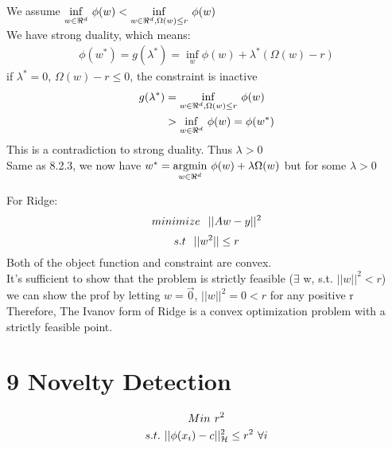 \documentclass{article}
\newenvironment{problem}[2][$\bullet$]{\begin{trivlist}\large
		\item[\hskip \labelsep {\bfseries #1}\hskip \labelsep {\bfseries #2.}]}  {\end{trivlist}}
\newenvironment{sub}[2][$-$]{\begin{trivlist}
		\item[\hskip \labelsep {\bfseries #1}\hskip \labelsep {\bfseries #2.}]}  {\end{trivlist}}
\begin{document}
\begin{sub}{8.2.4}
\end{sub}
We assume $\underset{w \in \Re^d}{\operatorname{inf}} \hspace{0.05in}\phi(w)  <\underset{w \in \Re^d ,\Omega(w) \leq r}{\operatorname{inf}} \hspace{0.05in}\phi(w)  $\\
We have strong duality, which means: 
\begin{align}
\phi(w^*) =g(\lambda^*) =  \underset{w}{\operatorname{inf}} \phi(w) + \lambda^*(\Omega(w) - r)
\end{align}
if $\lambda^* = 0$, $\Omega(w) -  r \leq 0 $, the constraint is inactive 
\begin{align}
g(\lambda^*) &=  \underset{w \in \Re^d ,\Omega(w) \leq r}{\operatorname{inf}} \hspace{0.05in}\phi(w)\\&> \underset{w \in \Re^d }{\operatorname{inf}} \hspace{0.05in}\phi(w) = \phi(w^*)
\end{align}
This is a contradiction to strong duality. Thus $\lambda >0$\\
Same as 8.2.3, we now have $w^*= \underset{w \in \Re^d}{\operatorname{argmin}} \hspace{0.05in}\phi(w) + \lambda \Omega(w) $ but  for some $\lambda >0$

\begin{problem}{8.3 Ivanov implies Tikhnov for Ridge Regression}
\end{problem}
For Ridge:
$$minimize \hspace{0.1in} ||Aw- y||^2$$
$$s.t  \hspace{0.1in} ||w^2|| \leq r$$
Both of the object function and constraint are convex.\\
It's sufficient to show that the problem is strictly feasible ($\exists$ w, s.t.  $ ||w||^2 < r$) \\
we can show the prof by letting $w = \vec{0}$, $||w||^2 = 0 < r$ for any positive r\\
Therefore, The Ivanov form of Ridge is a convex optimization problem with a strictly feasible point.
\pagebreak

\section{9 Novelty Detection}
\begin{sub}{9.1}
\end{sub}
$$Min \hspace{0.05in} r^2 $$
$$s.t. \hspace{0.05in}||\phi(x_i) - c||_{\mathcal{H}}^2 \leq r^2 \hspace{0.05in} \forall i$$
\end{document}
